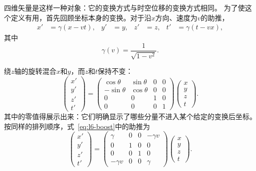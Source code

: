 四维矢量是这样一种对象：它的变换方式与时空位移的变换方式相同。
为了使这个定义有用，首先回顾坐标本身的变换。对于沿\(x\)方向、速度为\(v\)的助推，
\begin{align}
  x'&=\gamma(x-vt), & y'&=y, & z'&=z,
  & t'&=\gamma(t-vx),                                      \label{eq:l6-boost}
\end{align}
其中
\begin{equation}
  \gamma(v)=\frac{1}{\sqrt{1-v^2}}.
\end{equation}

\begin{classroomqa}
\end{classroomqa}

绕\(z\)轴的旋转混合\(x\)和\(y\)，而\(z\)和\(t\)保持不变：
\begin{equation}
\begin{pmatrix}
  x'\\ y'\\ z'\\ t'
\end{pmatrix}
=
\begin{pmatrix}
  \cos\theta & \sin\theta & 0 & 0\\
  -\sin\theta & \cos\theta & 0 & 0\\
  0 & 0 & 1 & 0\\
  0 & 0 & 0 & 1
\end{pmatrix}
\begin{pmatrix}
  x\\ y\\ z\\ t
\end{pmatrix}.
\end{equation}
其中的零值得展示出来：它们明确显示了哪些分量不进入某个给定的变换后坐标。按同样的排列顺序，式~\eqref{eq:l6-boost}中的助推为
\begin{equation}
\begin{pmatrix}
  x'\\ y'\\ z'\\ t'
\end{pmatrix}
=
\begin{pmatrix}
  \gamma & 0 & 0 & -\gamma v\\
  0 & 1 & 0 & 0\\
  0 & 0 & 1 & 0\\
  -\gamma v & 0 & 0 & \gamma
\end{pmatrix}
\begin{pmatrix}
  x\\ y\\ z\\ t
\end{pmatrix}.
\end{equation}

